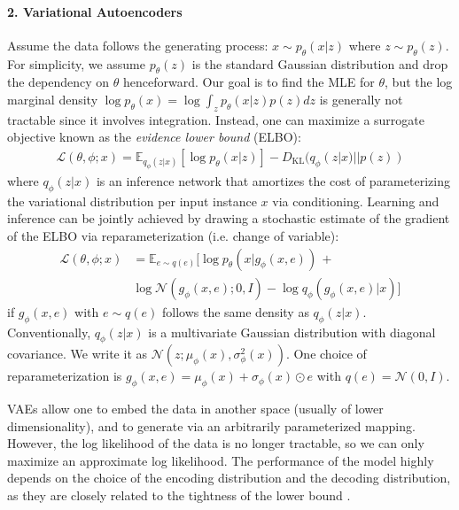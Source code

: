 \documentclass{article}
\def\gL{{\mathcal{L}}}
\def\gN{{\mathcal{N}}}
\newcommand{\E}{\mathbb{E}}
\newcommand{\KL}{D_{\mathrm{KL}}}
\begin{document}
\paragraph{2. Variational Autoencoders}
Assume the data follows the generating process: $x\sim p_\theta(x|z)$ where $z\sim p_\theta(z)$. 
For simplicity, we assume $p_\theta(z)$ is the standard Gaussian distribution and drop the dependency on $\theta$ henceforward. 
Our goal is to find the MLE for $\theta$, but the log marginal density $\log p_\theta(x) = \log \int_z p_\theta(x|z)p(z) dz$ is generally not tractable since it involves integration. 
Instead, one can maximize a surrogate objective known as the \emph{evidence lower bound} (ELBO):
\begin{align}
\gL(\theta,\phi; x) = \E_{q_\phi(z|x)}[\log p_\theta(x|z)] - \KL(q_\phi(z|x)||p(z))
\end{align}
where $q_\phi(z|x)$ is an inference network that amortizes the cost of parameterizing the variational distribution per input instance $x$ via conditioning. 
Learning and inference can be jointly achieved by drawing a stochastic estimate of the gradient of the ELBO via reparameterization (i.e. change of variable):
\begin{align}\gL(\theta,\phi; x)&=\E_{e\sim q(e)}[\log p_\theta(x|g_\phi(x,e)) \, + \label{eq:elbo_rep}\\
&\log \gN(g_\phi(x,e); 0,I) - \log q_\phi(g_\phi(x,e)|x)] \nonumber\end{align}
if $g_\phi(x,e)$ with $e\sim q(e)$ follows the same density as $q_\phi(z|x)$. Conventionally, $q_\phi(z|x)$ is a multivariate Gaussian distribution with diagonal covariance. 
We write it as $\gN(z; \mu_\phi(x), \sigma^2_\phi(x))$. 
One choice of reparameterization is $g_\phi(x,e)=\mu_\phi(x)+\sigma_\phi(x)\odot e$ with $q(e)=\gN(0,I)$. 


VAEs allow one to embed the data in another space (usually of lower dimensionality), and to generate via an arbitrarily parameterized mapping. 
However, the log likelihood of the data is no longer tractable, so we can only maximize an approximate log likelihood.
The performance of the model highly depends on the choice of the encoding distribution and the decoding distribution, as they are closely related to the tightness of the lower bound \citep{cremer2018inference}.
\end{document}

